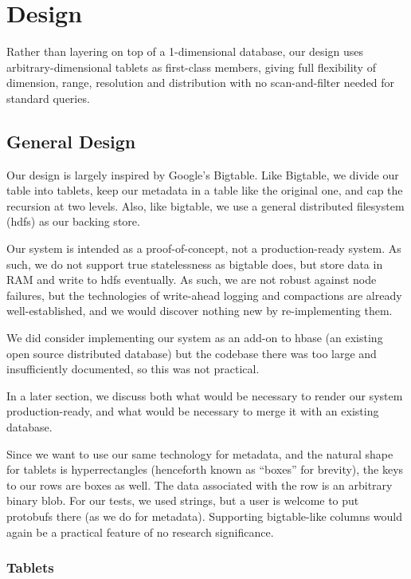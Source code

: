 \documentclass[11pt]{article}
\begin{document}
\section{Design}

Rather than layering on top of a 1-dimensional database, our design uses arbitrary-dimensional tablets as first-class members, giving full flexibility of dimension, range, resolution and distribution with no scan-and-filter needed for standard queries.

\subsection{General Design}

Our design is largely inspired by Google's Bigtable\cite{bigtable}. Like Bigtable, we divide our table into tablets, keep our metadata in a table like the original one, and cap the recursion at two levels. Also, like bigtable, we use a general distributed filesystem (hdfs) as our backing store.

Our system is intended as a proof-of-concept, not a production-ready system. As such, we do not support true statelessness as bigtable does, but store data in RAM and write to hdfs eventually. As such, we are not robust against node failures, but the technologies of write-ahead logging and compactions are already well-established, and we would discover nothing new by re-implementing them.

We did consider implementing our system as an add-on to hbase (an existing open source distributed database) but the codebase there was too large and insufficiently documented, so this was not practical.

In a later section, we discuss both what would be necessary to render our system production-ready, and what would be necessary to merge it with an existing database.

Since we want to use our same technology for metadata, and the natural shape for tablets is hyperrectangles (henceforth known as ``boxes'' for brevity), the keys to our rows are boxes as well. The data associated with the row is an arbitrary binary blob. For our tests, we used strings, but a user is welcome to put protobufs there (as we do for metadata). Supporting bigtable-like columns would again be a practical feature of no research significance.

\subsubsection{Tablets}
\end{document}
